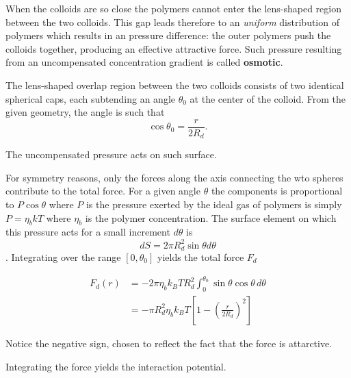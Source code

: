 \documentclass[
  letterpaper,
  enabledeprecatedfontcommands]{report}
\begin{document}
\begin{tcolorbox}[enhanced jigsaw, leftrule=.75mm, bottomrule=.15mm, toprule=.15mm, colbacktitle=quarto-callout-note-color!10!white, title=\textcolor{quarto-callout-note-color}{\faInfo}\hspace{0.5em}{Force-based derivation of the AO interaction}, breakable, titlerule=0mm, opacitybacktitle=0.6, colback=white, coltitle=black, colframe=quarto-callout-note-color-frame, bottomtitle=1mm, rightrule=.15mm, toptitle=1mm, left=2mm, opacityback=0, arc=.35mm]

When the colloids are so close the polymers cannot enter the lens-shaped
region between the two colloids. This gap leads therefore to an
\emph{uniform} distribution of polymers which results in an pressure
difference: the outer polymers push the colloids together, producing an
effective attractive force. Such pressure resulting from an
uncompensated concentration gradient is called \textbf{osmotic}.

The lens-shaped overlap region between the two colloids consists of two
identical spherical caps, each subtending an angle \(\theta_0\) at the
center of the colloid. From the given geometry, the angle is such that
\[\cos\theta_0 = \dfrac{r}{2R_d}.\]

The uncompensated pressure acts on such surface.

For symmetry reasons, only the forces along the axis connecting the wto
spheres contribute to the total force. For a given angle \(\theta\) the
components is proportional to \(P\cos\theta\) where \(P\) is the
pressure exerted by the ideal gas of polymers is simply \(P=\eta_b kT\)
where \(\eta_b\) is the polymer concentration. The surface element on
which this pressure acts for a small increment \(d\theta\) is
\[dS = 2\pi R_d^2\sin\theta d\theta\]. Integrating over the range
\([0,\theta_0]\) yields the total force \(F_d\)

\[
\begin{aligned}
F_d(r) &= -2\pi \eta_b k_B T R_d^2 \int_0^{\theta_0} \sin\theta \cos\theta \, d\theta \\
&= -\pi R_d^2 \eta_b k_B T \left[1 - \left(\frac{r}{2R_d}\right)^2\right]
\end{aligned}
\]

Notice the negative sign, chosen to reflect the fact that the force is
attarctive.

Integrating the force yields the interaction potential.

\end{tcolorbox}
\end{document}
